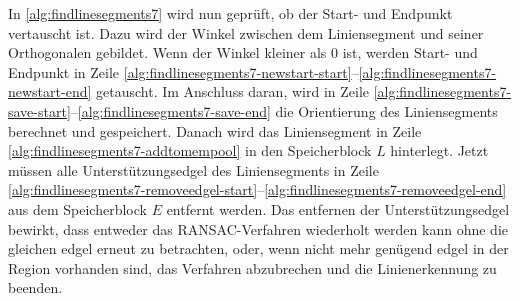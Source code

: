 

In \autoref{alg:findlinesegments7} wird nun geprüft, ob der Start- und Endpunkt vertauscht ist. Dazu wird der Winkel
 zwischen dem Liniensegment und seiner Orthogonalen gebildet. Wenn der Winkel kleiner als $0$ ist, werden Start- und
 Endpunkt in Zeile \ref{alg:findlinesegments7-newstart-start}--\ref{alg:findlinesegments7-newstart-end} getauscht. Im
 Anschluss daran, wird in Zeile \ref{alg:findlinesegments7-save-start}--\ref{alg:findlinesegments7-save-end} die
 Orientierung des Liniensegments berechnet und gespeichert. Danach wird das Liniensegment in Zeile
 \ref{alg:findlinesegments7-addtomempool} in den Speicherblock $L$ hinterlegt. Jetzt müssen alle Unterstützungsedgel
 des Liniensegments in Zeile \ref{alg:findlinesegments7-removeedgel-start}--\ref{alg:findlinesegments7-removeedgel-end}
 aus dem Speicherblock $E$ entfernt werden. Das entfernen der Unterstützungsedgel bewirkt, dass entweder das
 RANSAC-Verfahren wiederholt werden kann ohne die gleichen \gls{edgel} erneut zu betrachten, oder, wenn nicht mehr
 genügend \gls{edgel} in der Region vorhanden sind, das Verfahren abzubrechen und die Linienerkennung zu beenden.


